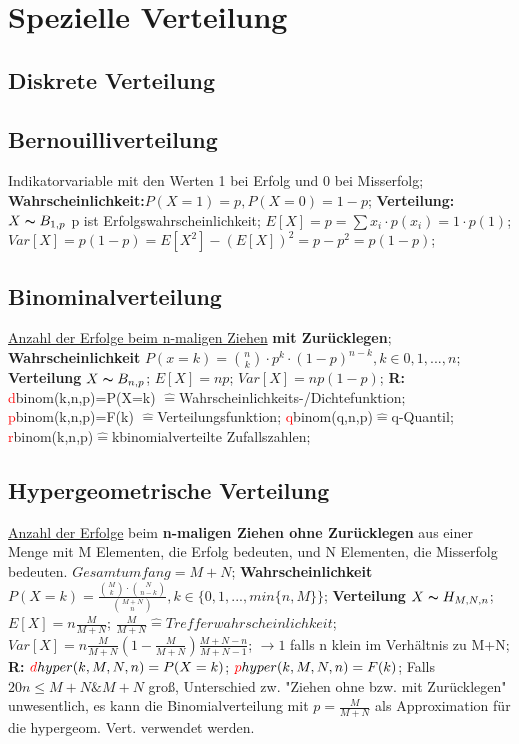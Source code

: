 \section{Spezielle Verteilung}
\subsection{Diskrete Verteilung}
\subsection{Bernouilliverteilung}
Indikatorvariable mit den Werten 1 bei Erfolg und 0 bei Misserfolg;
\textbf{Wahrscheinlichkeit:}$P(X=1) = p, P(X=0)  = 1 - p$; 
\textbf{Verteilung:} $X \thicksim B_{1,p}$ p ist Erfolgswahrscheinlichkeit; 
$E[X] = p = \sum x_{i} \cdot p(x_{i}) = 1 \cdot p(1)$; 
$Var[X] = p(1-p)  = E[X^2] -(E[X])^2 = p - p^2 = p(1-p)$; 
\subsection{Binominalverteilung}
\underline{Anzahl der Erfolge beim n-maligen Ziehen} \textbf{mit Zurücklegen};
\textbf{Wahrscheinlichkeit} $ P(x = k ) =  \binom{n}{k} \cdot p^k \cdot (1-p)^{n-k}, k \in {0, 1, ..., n}$; 
\textbf{Verteilung} $ X \thicksim B_{n, p}$; 
$E[X] = np$; 
$ Var[X] = np(1-p) $; 
\textbf{R:}
\textcolor{red}{d}binom(k,n,p)=P(X=k) $\hat{=}$Wahrscheinlichkeits-/Dichtefunktion; 
\textcolor{red}{p}binom(k,n,p)=F(k) $\hat{=}$Verteilungsfunktion; 
\textcolor{red}{q}binom(q,n,p)$\hat{=}$q-Quantil; 
\textcolor{red}{r}binom(k,n,p)$\hat{=}$kbinomialverteilte Zufallszahlen; 
\subsection{Hypergeometrische Verteilung}
\underline{Anzahl der Erfolge} beim \textbf{n-maligen Ziehen ohne Zurücklegen} aus einer Menge mit M Elementen, die Erfolg bedeuten, und N Elementen, die Misserfolg bedeuten. $Gesamtumfang = M + N$;
\textbf{Wahrscheinlichkeit}
$ P(X=k) = \frac{\binom{M}{k} \cdot \binom{N}{n-k}}{\binom{M+N}{n}}, k \in \{0, 1, ..., min\{n,M\}\}$;
\textbf{Verteilung} $ X \thicksim H_{M, N, n}$; $E[X] = n \frac{M}{M+N}$; $\frac{M}{M+N} \hat{=} Trefferwahrscheinlichkeit$; $Var[X] = n \frac{M}{M+N}( 1 - \frac{M}{M+N}) \frac{M+N-n}{M+N-1}$; $\rightarrow 1$ falls n klein im Verhältnis zu M+N;
\textbf{R:}
$\textcolor{red}{d}hyper(k,M,N,n)=P(X=k)$;
$\textcolor{red}{p}hyper(k,M,N,n)=F(k)$;
Falls $ 20n \le M + N \& M + N $ groß, Unterschied zw. "Ziehen ohne bzw. mit Zurücklegen" unwesentlich, es kann die Binomialverteilung mit $ p = \frac{M}{M+N} $ als Approximation für die hypergeom. Vert. verwendet werden.
